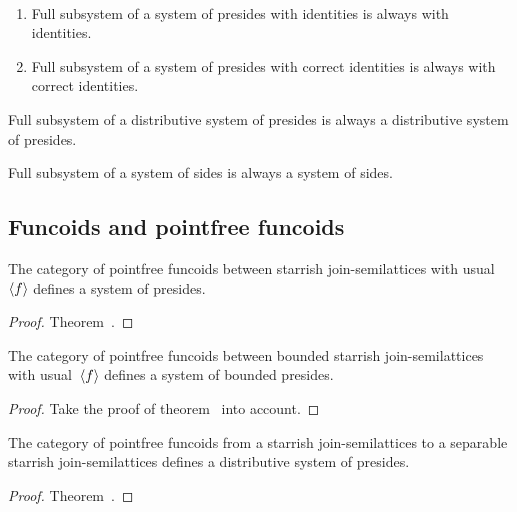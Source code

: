 \begin{obvious}
~
\begin{enumerate}
\item Full subsystem of a system of presides with identities is always with identities.
\item Full subsystem of a system of presides with correct identities is always with correct identities.
\end{enumerate}
\end{obvious}

\begin{obvious}
Full subsystem of a distributive system of presides is always a distributive system of presides.
\end{obvious}

\begin{obvious}
Full subsystem of a system of sides is always a system of sides.
\end{obvious}

\subsection{Funcoids and pointfree funcoids}

\begin{prop}
The category of pointfree funcoids between starrish join-semilattices with usual~$\left\langle f\right\rangle$ defines a system of presides.
\end{prop}

\begin{proof}
Theorem~.
\end{proof}

\begin{prop}
The category of pointfree funcoids between bounded starrish join-semilattices with usual~$\left\langle f\right\rangle$ defines a system of
bounded presides.
\end{prop}

\begin{proof}
Take the proof of theorem~ into account.
\end{proof}

\begin{prop}
The category of pointfree funcoids from a starrish join-semilattices to a separable starrish join-semilattices
defines a distributive system of presides.
\end{prop}

\begin{proof}
Theorem~.
\end{proof}

